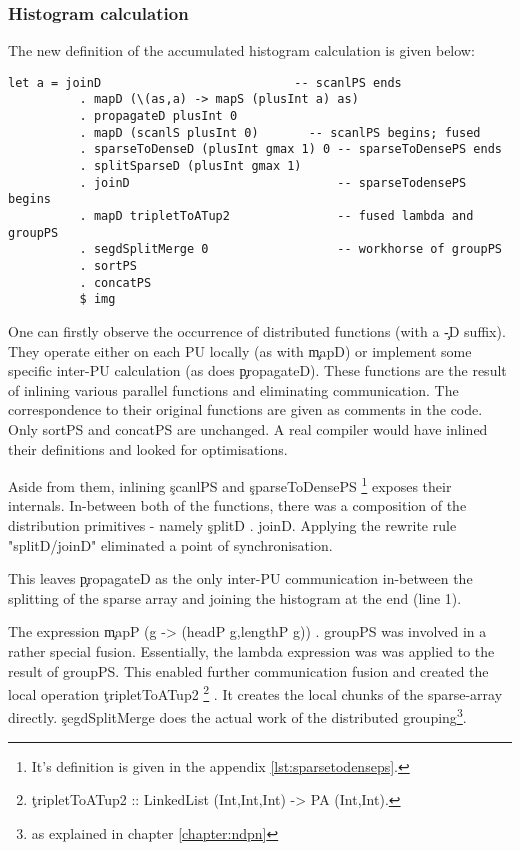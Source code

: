     \subsubsection{Histogram calculation}
      The new definition of the accumulated histogram calculation is given below:
      \begin{lstlisting}
let a = joinD                           -- scanlPS ends
          . mapD (\(as,a) -> mapS (plusInt a) as)
          . propagateD plusInt 0
          . mapD (scanlS plusInt 0)       -- scanlPS begins; fused
          . sparseToDenseD (plusInt gmax 1) 0 -- sparseToDensePS ends
          . splitSparseD (plusInt gmax 1)     
          . joinD                             -- sparseTodensePS begins
          . mapD tripletToATup2               -- fused lambda and groupPS 
          . segdSplitMerge 0                  -- workhorse of groupPS
          . sortPS
          . concatPS
          $ img
      \end{lstlisting}
      One can firstly observe the occurrence of distributed functions (with a \c{-D} suffix). They operate either
      on each PU locally (as with \c{mapD}) or implement some specific inter-PU calculation (as does \c{propagateD}).
      These functions are the result of inlining various parallel functions and eliminating communication.
      The correspondence to their original functions are given as comments in the code. Only sortPS and concatPS
      are unchanged. A real compiler would have inlined their definitions and looked for optimisations.      
      
      Aside from them, inlining \c{scanlPS} and \c{sparseToDensePS}
      \footnote{It's definition is given in the appendix \ref{lst:sparsetodenseps}.} exposes their internals.
      In-between both of the functions, there was a composition of the distribution primitives - namely \c{splitD . joinD}.
      Applying the rewrite rule "splitD/joinD" eliminated a point of synchronisation.
      
      This leaves \c{propagateD} as the only inter-PU communication in-between the splitting of the
      sparse array and joining the histogram at the end (line 1).
      
      The expression \c{mapP (\lam g -> (headP g,lengthP g)) . groupPS}
      was involved in a rather special fusion. Essentially, the lambda expression was
      was applied to the result of groupPS. This enabled further communication
      fusion and created the local operation \c{tripletToATup2}
      \footnote{\c{tripletToATup2 :: LinkedList (Int,Int,Int) -> PA (Int,Int)}.}
      . It creates the
      local chunks of the sparse-array directly. \c{segdSplitMerge} does the
      actual work of the distributed grouping\footnote{as explained in chapter \ref{chapter:ndpn}}.
      
